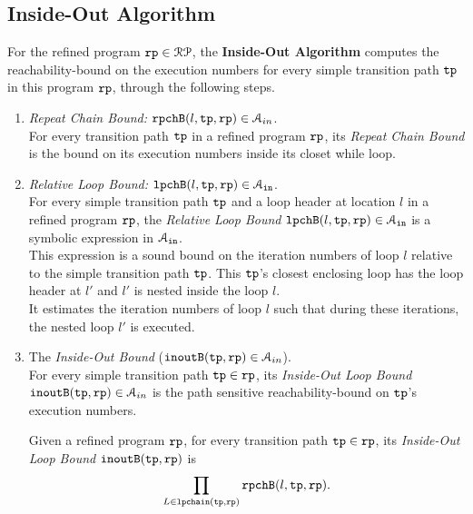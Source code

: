 \subsection{Inside-Out Algorithm}
\label{sec:inoutalg}
For the refined program $\mathtt{rp} \in \mathcal{RP}$, the \textbf{Inside-Out Algorithm}
computes the reachability-bound on the execution numbers for every simple transition path $\mathtt{tp}$ in this program $\mathtt{rp}$,
through the following steps.
%
\begin{enumerate}
  \item \emph{Repeat Chain Bound:} $\mathtt{rpchB}(l, \mathtt{tp}, \mathtt{rp}) \in \mathcal{A}_{in}$.
  \\
  For every transition path $\mathtt{tp}$ in a refined program $\mathtt{rp}$,
  its \emph{Repeat Chain Bound} is the
  bound on its execution numbers inside its closet while loop.
  \item \emph{Relative Loop Bound:} $\mathtt{lpchB}(l, \mathtt{tp}, \mathtt{rp}) \in \mathcal{A}_{\mathtt{in}}$.
  \\
  For every simple transition path $\mathtt{tp}$
and a loop header at location $l$ in a refined program $\mathtt{rp}$,
the \emph{Relative Loop Bound} $\mathtt{lpchB}(l, \mathtt{tp}, \mathtt{rp}) \in \mathcal{A}_{\mathtt{in}}$ is a symbolic expression in $\mathcal{A}_{\mathtt{in}}$.
\\
This expression is a sound bound on the iteration numbers of loop $l$ relative to the simple transition path $\mathtt{tp}$.
This $\mathtt{tp}$'s closest enclosing loop has the loop header at $l'$ and $l'$ is nested inside the loop $l$.
\\
It estimates the iteration numbers of loop $l$ such that during these iterations, the nested loop $l'$ is executed.
%
\item The \emph{Inside-Out Bound} ($\mathtt{inoutB}(\mathtt{tp}, \mathtt{rp}) \in \mathcal{A}_{in}$).
\\
For every simple transition path $\mathtt{tp} \in \mathtt{rp}$,
its \emph{Inside-Out Loop Bound}
 $\mathtt{inoutB}(\mathtt{tp}, \mathtt{rp}) \in \mathcal{A}_{in}$ is 
the path sensitive reachability-bound on $\mathtt{tp}$'s execution numbers.

\begin{defn}
  \label{def:outin_bound}
  Given a refined program $\mathtt{rp}$, for every transition path $\mathtt{tp} \in \mathtt{rp}$, 
  its \emph{Inside-Out Loop Bound}
  $\mathtt{inoutB}(\mathtt{tp}, \mathtt{rp})$ is 
\[
  \prod\limits_{L \in \mathtt{lpchain}(\mathtt{tp}, \mathtt{rp})} \mathtt{rpchB}(l, \mathtt{tp}, \mathtt{rp}).
\]
\end{defn}
\end{enumerate}
